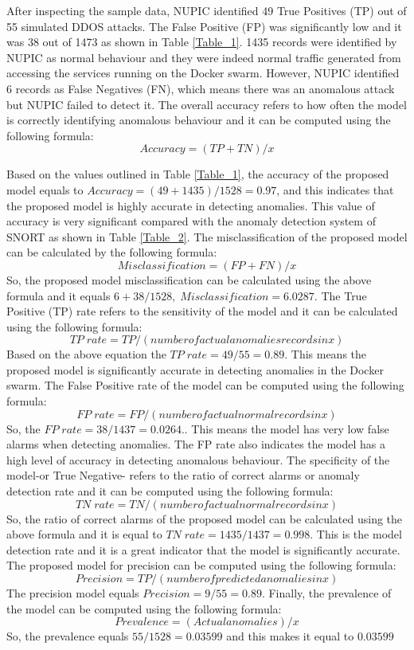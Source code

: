 \documentclass[sigconf]{acmart}
\begin{document}
 
 
 
After inspecting the sample data, NUPIC identified 49 True Positives (TP) out of 55 simulated DDOS attacks. The False Positive (FP) was significantly low and it was 38 out of 1473 as shown in Table \ref{Table_1}. 1435 records were identified by NUPIC as normal behaviour and they were indeed normal traffic generated from accessing the services running on the Docker swarm. However, NUPIC identified 6 records as False Negatives (FN), which means there was an anomalous attack but NUPIC failed to detect it. The overall accuracy refers to how often the model is correctly identifying anomalous behaviour and it can be computed using the following formula: 
\[ Accuracy=  (TP+TN)/x \]

Based on the values outlined in Table \ref{Table_1}, the accuracy of the proposed model equals to $Accuracy=  (49 +1435)/1528=0.97$, and this indicates that the proposed model is highly accurate in detecting anomalies. This value of accuracy is very significant compared with the anomaly detection system of SNORT as shown in Table \ref{Table_2}. The misclassification of the proposed model can be calculated by the following formula: 
\[ Misclassification =  (FP+FN )/x \] So, the proposed model misclassification can be calculated using the above formula and it equals $6 + 38/1528, \; Misclassification = 6.0287$.
The True Positive (TP) rate refers to the sensitivity of the model and it can be calculated using the following formula:
\[TP \;  rate=  TP/(number of actual anomalies records in x)\]
Based on the above equation the $TP \; rate = 49/55 = 0.89$. This means the proposed model is significantly accurate in detecting anomalies in the Docker swarm. The False Positive rate of the model can be computed using the following formula: 
\[FP \;  rate =FP/(number of actual normal records in x)\]
So, the $FP \; rate = 38/1437=0.0264.$. This means the model has very low false alarms when detecting anomalies. The FP rate also indicates the model has a high level of accuracy in detecting anomalous behaviour. The specificity of the model-or True Negative- refers to the ratio of correct alarms or anomaly detection rate and it can be computed using the following formula: 
\[TN \; rate=TN/(number of actual normal records in x)\]
So, the ratio of correct alarms of the proposed model can be calculated using the above formula and it is equal to $TN \;  rate=1435/1437=0.998$. This is the model detection rate and it is a great indicator that the model is significantly accurate. The proposed model for precision can be computed using the following formula: 
\[Precision=  TP/(number of predicted anomalies in x)\]
The precision model equals $Precision=9/55=0.89$. Finally, the prevalence of the model can be computed using the following formula: 
\[Prevalence=(Actual anomalies)/x\]
So, the prevalence equals $55/1528=0.03599$ and this makes it equal to $0.03599$
\end{document}
